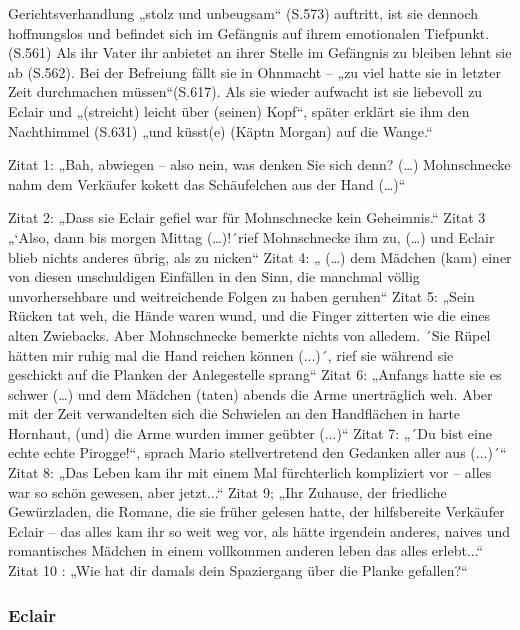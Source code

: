 Gerichtsverhandlung „stolz und unbeugsam“ (S.573) auftritt, ist sie dennoch hoffnungslos und befindet sich im Gefängnis auf ihrem emotionalen Tiefpunkt.(S.561) Als ihr Vater ihr anbietet an ihrer Stelle im Gefängnis zu bleiben lehnt sie ab (S.562). Bei der Befreiung fällt sie in Ohnmacht – „zu viel hatte sie in letzter Zeit durchmachen müssen“(S.617). Als sie wieder aufwacht ist sie liebevoll zu Eclair und „(streicht) leicht über (seinen) Kopf“, später erklärt sie ihm den Nachthimmel (S.631) „und küsst(e) (Käptn Morgan) auf die Wange.“


Zitat 1:  „Bah, abwiegen – also nein, was denken Sie sich denn? (…) Mohnschnecke nahm dem Verkäufer kokett das Schäufelchen aus der Hand (…)“

Zitat 2: „Dass sie Eclair gefiel war für Mohnschnecke kein Geheimnis.“
Zitat 3 „`Also, dann bis morgen Mittag (…)!´rief Mohnschnecke ihm zu, (…) und Eclair blieb nichts anderes übrig, als zu nicken“
Zitat 4: „ (…) dem Mädchen (kam) einer von diesen unschuldigen Einfällen in den Sinn, die manchmal völlig unvorhersehbare und weitreichende Folgen zu haben geruhen“
Zitat 5: „Sein Rücken tat weh, die Hände waren wund, und die Finger zitterten wie die eines alten Zwiebacks. Aber Mohnschnecke bemerkte nichts von alledem. ´Sie Rüpel hätten mir ruhig mal die Hand reichen können (...)´, rief sie während sie geschickt auf die Planken der Anlegestelle sprang“
Zitat 6: „Anfangs hatte sie es schwer (…) und dem Mädchen (taten) abends die Arme unerträglich weh. Aber mit der Zeit verwandelten sich die Schwielen an den Handflächen in harte Hornhaut, (und) die Arme wurden immer geübter (...)“
Zitat 7: „´Du bist eine echte echte Pirogge!“, sprach Mario stellvertretend den Gedanken aller aus (...)´“
Zitat 8: „Das Leben kam ihr mit einem Mal fürchterlich kompliziert vor – alles war so schön gewesen, aber jetzt...“
Zitat 9; „Ihr Zuhause, der friedliche Gewürzladen, die Romane, die sie früher gelesen hatte, der hilfsbereite Verkäufer Eclair – das alles kam ihr so weit weg vor, als hätte irgendein anderes, naives und romantisches Mädchen in einem vollkommen anderen leben das alles erlebt...“
Zitat 10 : „Wie hat dir damals dein Spaziergang über die Planke gefallen?“


\subsubsection{Eclair}

